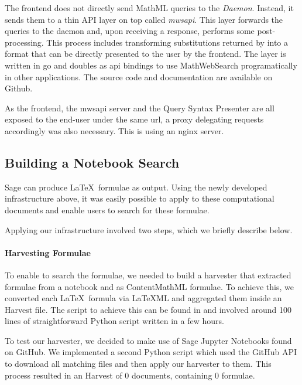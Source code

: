 The frontend does not directly send MathML queries to the \textit{Daemon}.
Instead, it sends them to a thin API layer on top called \textit{mwsapi}. 
This layer forwards the queries to the daemon and, upon receiving a response, performs some post-processing. 
This process includes transforming substitutions returned by \MWS into a format that can be directly presented to the user by the frontend. 
The layer is written in go and doubles as api bindings to use MathWebSearch programatically in other applications. 
The source code and documentation are available on Github. 

As the frontend, the mwsapi server and the Query Syntax Presenter are all exposed to the end-user under the same url, a proxy delegating requests accordingly was also necessary. 
This is using an nginx  server. 

\subsection{Building a Notebook Search}

Sage can produce \LaTeX\ formulae as output.
Using the newly developed infrastructure above, it was easily possible to apply \MWS to these computational documents and enable users to search for these formulae. 

Applying our infrastructure involved two steps, which we briefly describe below.

\paragraph{Harvesting Formulae}
To enable \MWS to search the formulae, we needed to build a harvester that extracted formulae from a notebook and as ContentMathML formulae. 
To achieve this, we converted each \LaTeX\ formula via LaTeXML and aggregated them inside an \MWS Harvest file. 
The script to achieve this can be found in  and involved around 100 lines of straightforward Python script written in a few hours. 

To test our harvester, we decided to make use of Sage Jupyter Notebooks found on GitHub. 
We implemented a second Python script which used the GitHub API to download all matching files and then apply our harvester to them. 
This process resulted in an \MWS Harvest of $0$ documents, containing $0$ formulae.

